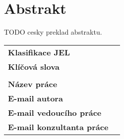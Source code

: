 \section*{Abstrakt}\label{abstract}

TODO cesky preklad abstraktu. 

\bigskip

\begin{tabular}{lp{7.7cm}}
		\textbf{Klasifikace JEL} & \JEL \\
		\textbf{Kl\'{i}\v{c}ov\'{a} slova} & \Klic \\
 		& \\
		\textbf{N\'{a}zev pr\'{a}ce} & \BooknameCZ \\
 		\textbf{E-mail autora} & \texttt{\href{mailto:\Email}{\Email}}\\
		\textbf{E-mail vedouc\'{i}ho pr\'{a}ce} & \texttt{\href{mailto:\EmailSup}{\EmailSup}}\\
		\textbf{E-mail konzultanta pr\'{a}ce} & \texttt{\href{mailto:\EmailCon}{\EmailCon}}\\
\end{tabular}

